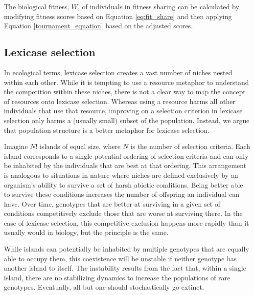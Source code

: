 The biological fitness, $W$, of individuals in fitness sharing can be calculated by modifying fitness scores based on Equation \ref{eq:fit_share} and then applying Equation \ref{tournament_equation} based on the adjusted scores.

\subsection{Lexicase selection}

In ecological terms, lexicase selection creates a vast number of niches nested within each other. While it is tempting to use a resource metaphor to understand the competition within these niches, there is not a clear way to map the concept of resources onto lexicase selection. Whereas using a resource harms all other individuals that use that resource, improving on a selection criterion in lexicase selection only harms a (usually small) subset of the population. Instead, we argue that population structure is a better metaphor for lexicase selection. 

Imagine $N!$ islands of equal size, where $N$ is the number of selection criteria. Each island corresponds to a single potential ordering of selection criteria and can only be inhabited by the individuals that are best at that ordering. This arrangement is analogous to situations in nature where niches are defined exclusively by an organism's ability to survive a set of harsh abiotic conditions. Being better able to survive these conditions increases the number of offspring an individual can have. Over time, genotypes that are better at surviving in a given set of conditions competitively exclude those that are worse at surviving there. In the case of lexicase selection, this competitive exclusion happens more rapidly than it usually would in biology, but the principle is the same. 



While islands can potentially be inhabited by multiple genotypes that are equally able to occupy them, this coexistence will be unstable if neither genotype has another island to itself. The instability results from the fact that, within a single island, there are no stabilizing dynamics to increase the populations of rare genotypes. Eventually, all but one should stochastically go extinct.

